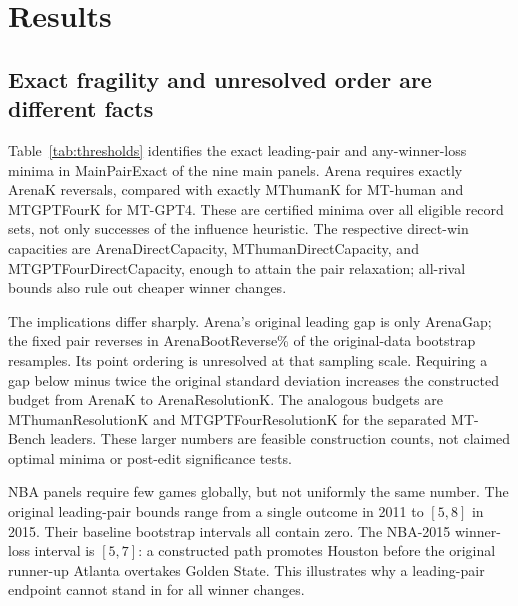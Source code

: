 \documentclass{article}
\newcommand{\num}[1]{\csname #1\endcsname}
\begin{document}
\section{Results}
\label{sec:results}
\begin{table}[t]
\caption{Certified optimal-count intervals and constructed budgets. A single number means lower and feasible upper bounds agree, hence exactness. $U$ is the static leading-pair construction, even where an interval remains. Winner loss considers every rival and may precede runner-up reversal. $U_{2s}$ crosses the frozen two-bootstrap-SD margin. Percentages use the pair construction $U$.}
\label{tab:thresholds}
\centering\small
\end{table}

\subsection{Exact fragility and unresolved order are different facts}
Table~\ref{tab:thresholds} identifies the exact leading-pair and any-winner-loss minima in \num{MainPairExact} of the nine main panels. Arena requires exactly \num{ArenaK} reversals, compared with exactly \num{MThumanK} for MT-human and \num{MTGPTFourK} for MT-GPT4. These are certified minima over all eligible record sets, not only successes of the influence heuristic. The respective direct-win capacities are \num{ArenaDirectCapacity}, \num{MThumanDirectCapacity}, and \num{MTGPTFourDirectCapacity}, enough to attain the pair relaxation; all-rival bounds also rule out cheaper winner changes.

The implications differ sharply. Arena's original leading gap is only \num{ArenaGap}; the fixed pair reverses in \num{ArenaBootReverse}\% of the original-data bootstrap resamples. Its point ordering is unresolved at that sampling scale. Requiring a gap below minus twice the original standard deviation increases the constructed budget from \num{ArenaK} to \num{ArenaResolutionK}. The analogous budgets are \num{MThumanResolutionK} and \num{MTGPTFourResolutionK} for the separated MT-Bench leaders. These larger numbers are feasible construction counts, not claimed optimal minima or post-edit significance tests.

NBA panels require few games globally, but not uniformly the same number. The original leading-pair bounds range from a single outcome in 2011 to $[5,8]$ in 2015. Their baseline bootstrap intervals all contain zero. The NBA-2015 winner-loss interval is $[5,7]$: a constructed path promotes Houston before the original runner-up Atlanta overtakes Golden State. This illustrates why a leading-pair endpoint cannot stand in for all winner changes.
\end{document}
